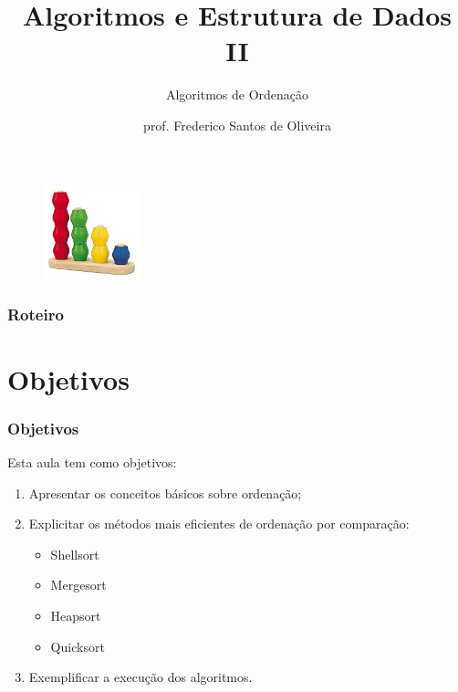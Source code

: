 \documentclass[aspectratio=169]{beamer}
\title[Algoritmos de Ordenação]{Algoritmos e Estrutura de Dados II}
\subtitle{Algoritmos de Ordenação}
\author[Frederico Santos de Oliveira]{prof. Frederico Santos de Oliveira}
\institute[UFMT]{Universidade Federal de Mato Grosso\\ Instituto de Engenharia}
\date{}
\begin{document}
\begin{frame}
\titlepage %

\begin{figure}[!h]
  \centering
  \includegraphics[width=80pt]{imgs/introducao.jpg}
  \label{fig_introducao}
\end{figure}
\end{frame}


\begin{frame}
\frametitle{Roteiro} %
\tableofcontents %
\end{frame}


\section{Objetivos}

\begin{frame}
\frametitle{Objetivos}

Esta aula tem como objetivos:

\begin{enumerate}
\item Apresentar os conceitos básicos sobre ordenação;
\item Explicitar os métodos mais eficientes de ordenação por comparação:
\begin{itemize}
 \item Shellsort
 \item Mergesort
 \item Heapsort
 \item Quicksort
 \end{itemize}
\item Exemplificar a execução dos algoritmos.
\end{enumerate}
\end{frame}
\end{document}
